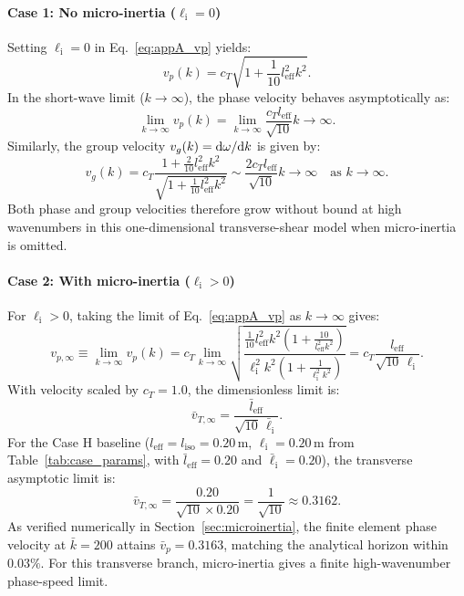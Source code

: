 \paragraph{Case 1: No micro-inertia ($\ell_{\mathrm{i}} = 0$)}
Setting $\ell_{\mathrm{i}} = 0$ in Eq.~\eqref{eq:appA_vp} yields:
\begin{equation}
v_p(k) = c_T \sqrt{1 + \frac{1}{10} l_{\mathrm{eff}}^2 k^2}.
\label{eq:appA_vp_zero}
\end{equation}
In the short-wave limit ($k \to \infty$), the phase velocity behaves asymptotically as:
\begin{equation}
\lim_{k \to \infty} v_p(k) = \lim_{k \to \infty} \frac{c_T l_{\mathrm{eff}}}{\sqrt{10}} k \to \infty.
\label{eq:appA_unbounded}
\end{equation}
Similarly, the group velocity $v_g(k) = \mathrm{d}\omega/\mathrm{d} k$ is given by:
\begin{equation}
v_g(k) = c_T \frac{1 + \frac{2}{10} l_{\mathrm{eff}}^2 k^2}{\sqrt{1 + \frac{1}{10} l_{\mathrm{eff}}^2 k^2}} \sim \frac{2 c_T l_{\mathrm{eff}}}{\sqrt{10}} k \to \infty \quad \text{as } k \to \infty.
\label{eq:appA_vg_unbounded}
\end{equation}
Both phase and group velocities therefore grow without bound at high wavenumbers in this one-dimensional transverse-shear model when micro-inertia is omitted.

\paragraph{Case 2: With micro-inertia ($\ell_{\mathrm{i}} > 0$)}
For $\ell_{\mathrm{i}} > 0$, taking the limit of Eq.~\eqref{eq:appA_vp} as $k \to \infty$ gives:
\begin{equation}
v_{p,\infty} \equiv \lim_{k \to \infty} v_p(k) = c_T \lim_{k \to \infty} \sqrt{\frac{\frac{1}{10} l_{\mathrm{eff}}^2 k^2 (1 + \frac{10}{l_{\mathrm{eff}}^2 k^2})}{\ell_{\mathrm{i}}^2 k^2 (1 + \frac{1}{\ell_{\mathrm{i}}^2 k^2})}} = c_T \frac{l_{\mathrm{eff}}}{\sqrt{10}\,\ell_{\mathrm{i}}}.
\label{eq:appA_vp_bounded}
\end{equation}
With velocity scaled by $c_T = 1.0$, the dimensionless limit is:
\begin{equation}
\bar{v}_{T,\infty} = \frac{\bar{l}_{\mathrm{eff}}}{\sqrt{10}\,\bar{\ell}_{\mathrm{i}}}.
\label{eq:appA_v_horizon}
\end{equation}
For the Case H baseline ($l_{\mathrm{eff}} = l_{\mathrm{iso}} = 0.20\,\mathrm{m}$, $\ell_{\mathrm{i}} = 0.20\,\mathrm{m}$ from Table~\ref{tab:case_params}, with $\bar{l}_{\mathrm{eff}} = 0.20$ and $\bar{\ell}_{\mathrm{i}} = 0.20$), the transverse asymptotic limit is:
\begin{equation}
\bar{v}_{T,\infty} = \frac{0.20}{\sqrt{10} \times 0.20} = \frac{1}{\sqrt{10}} \approx 0.3162.
\label{eq:appA_horizon_val}
\end{equation}
As verified numerically in Section~\ref{sec:microinertia}, the finite element phase velocity at $\bar{k} = 200$ attains $\bar{v}_p = 0.3163$, matching the analytical horizon within $0.03\%$. For this transverse branch, micro-inertia gives a finite high-wavenumber phase-speed limit.
